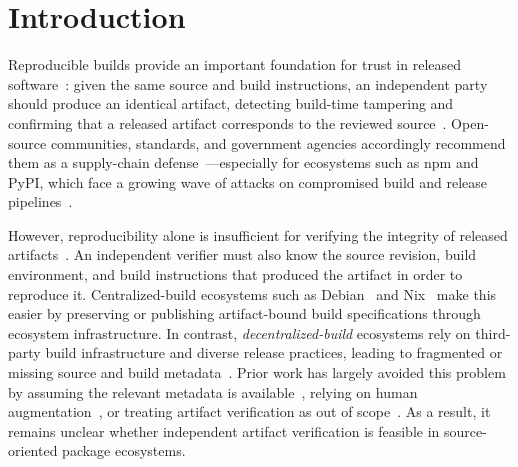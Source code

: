 \section{Introduction}

Reproducible builds provide an important foundation for trust in released software~\cite{lamb_reproducible_2022,fourne_its_2023,benedetti_empirical_2025}: given the same source and build instructions, an independent party should produce an identical artifact, detecting build-time tampering and confirming that a released artifact corresponds to the reviewed source~\cite{WhyReproducibleBuilds,BestpracticesSoftwaresupplychainOssscbestpracticesmd}. Open-source communities, standards, and government agencies accordingly recommend them as a supply-chain defense~\cite{moore__software_2024,CISANSAODNI2022,sigOpenSourceProject}---especially for ecosystems such as npm and PyPI, which face a growing wave of attacks on compromised build and release pipelines~\cite{snykNodeIpc2026,snykAntV2026,stepsecurityDurabletask2026,snykTanstack2026}.

However, reproducibility alone is insufficient for verifying the integrity of released artifacts~\cite{xiongBuildVerifiabilityJavabased2022,decarnedecarnavaletChallengesImplicationsVerifiable2014}.
An independent verifier must also know the source revision, build environment, and build instructions that produced the artifact in order to reproduce it.
Centralized-build ecosystems such as Debian~\cite{lamb_reproducible_2022} and Nix~\cite{malkaDoesFunctionalPackage2025} make this easier by preserving or publishing artifact-bound build specifications through ecosystem infrastructure.
In contrast, \textit{decentralized-build} ecosystems rely on third-party build infrastructure and diverse release practices, leading to fragmented or missing source and build metadata~\cite{goswami_npm_2020, gao_pyradar_2024}.
Prior work has largely avoided this problem by assuming the relevant metadata is available~\cite{benedetti_empirical_2025}, relying on human augmentation~\cite{google_oss_rebuild}, or treating artifact verification as out of scope~\cite{hassanshahiUnlockingReproducibilityAutomating2025}.
As a result, it remains unclear whether independent artifact verification is feasible in source-oriented package ecosystems.


